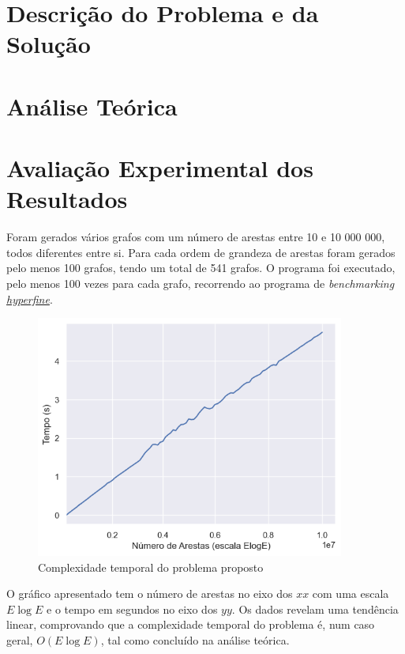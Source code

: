 \documentclass[12pt,a4paper]{article}
\begin{document}
  \section{Descrição do Problema e da Solução}

  \section{Análise Teórica}

  \section{Avaliação Experimental dos Resultados}

  Foram gerados vários grafos com um número de arestas entre 10 e 10 000 000, todos diferentes entre si. Para cada ordem de grandeza de arestas foram gerados pelo menos 100 grafos, tendo um total de 541 grafos.
  O programa foi executado, pelo menos 100 vezes para cada grafo, recorrendo ao programa de \textit{benchmarking} \href{https://github.com/sharkdp/hyperfine}{\textit{hyperfine}}.

  \begin{figure}[H]
    \centering
    \includegraphics[width=4in]{report.png}
    \caption{Complexidade temporal do problema proposto}
    \label{fig:graphic}
  \end{figure}

  O gráfico apresentado tem o número de arestas no eixo dos $xx$ com uma escala $E \log E$ e o tempo em segundos no eixo dos $yy$.
  Os dados revelam uma tendência linear, comprovando que a complexidade temporal do problema é, num caso geral, $O(E\log E)$, tal como concluído na análise teórica.

  \printbibliography[title={Referência}]
\end{document}
